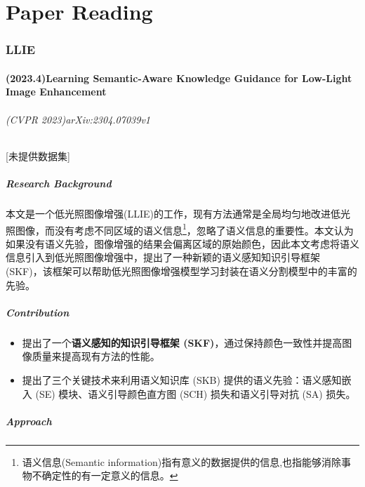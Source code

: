 \documentclass[letterpaper,10pt]{article}
\begin{document}
	
	\part{Paper Reading}
	
	\section{LLIE}
	
		\subsection{(2023.4)Learning Semantic-Aware Knowledge Guidance for Low-Light Image Enhancement}
		\paragraph{(CVPR 2023)arXiv:2304.07039v1} [未提供数据集]
		
			\subsubsection{Research Background}
			
			本文是一个低光照图像增强(LLIE)的工作，现有方法通常是全局均匀地改进低光照图像，而没有考虑不同区域的语义信息\footnote{语义信息(Semantic information)指有意义的数据提供的信息,也指能够消除事物不确定性的有一定意义的信息。}，忽略了语义信息的重要性。本文认为如果没有语义先验，图像增强的结果会偏离区域的原始颜色，因此本文考虑将语义信息引入到低光照图像增强中，提出了一种新颖的语义感知知识引导框架 (SKF)，该框架可以帮助低光照图像增强模型学习封装在语义分割模型中的丰富的先验。
		
			\subsubsection{Contribution}
	
			\begin{itemize}
				\item [(1)]
				提出了一个\textbf{语义感知的知识引导框架 (SKF)}，通过保持颜色一致性并提高图像质量来提高现有方法的性能。
				\item [(2)]
				提出了三个关键技术来利用语义知识库 (SKB) 提供的语义先验：语义感知嵌入 (SE) 模块、语义引导颜色直方图 (SCH) 损失和语义引导对抗 (SA) 损失。
			\end{itemize}
		
		
			\subsubsection{Approach}
			
\end{document}
